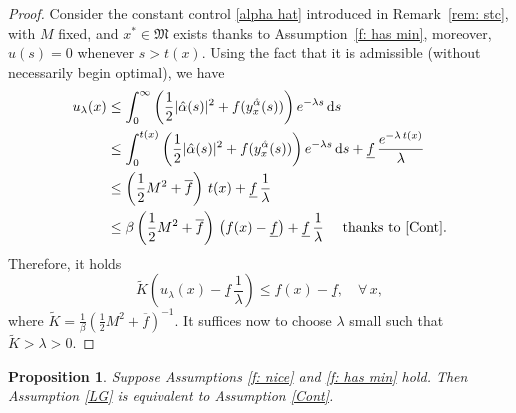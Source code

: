 \documentclass[12pt]{amsart}
\newcommand{\D}[1]{\mbox{\rm #1}}
\newcommand{\dd}{\D{d}}
\numberwithin{equation}{section}
\theoremstyle{plain}
\newtheorem{proposition}[theorem]{Proposition}
\begin{document}
\begin{proof}
Consider the constant control \eqref{alpha hat} introduced in Remark~\ref{rem: stc}, with $M$ fixed, and  $x^{*}\in \mathfrak{M}$ exists thanks to Assumption~\ref{f: has min}, moreover, $\hat{u}(s) = 0$ whenever $s> t(x)$.  Using the fact that it is admissible (without necessarily begin optimal), we have
\begingroup
\allowdisplaybreaks
\begin{align*}
    u_{\lambda}(x) 
    & \leq \int_{0}^{\infty} \left(\frac{1}{2}|\hat{\alpha}(s)|^{2} + f(y_{x}^{\hat{\alpha}}(s))\right)e^{-\lambda s}\, \dd s\\
    & \leq \int_{0}^{t(x)} \left(\frac{1}{2}|\hat{\alpha}(s)|^{2} + f(y_{x}^{\hat{\alpha}}(s))\right)e^{-\lambda s}\, \dd s + \underline{f}\,\frac{e^{-\lambda \,t(x)}}{\lambda}\\
    & \leq  \left(\frac{1}{2}M^{2} + \overline{f}\right)\,t(x) + \underline{f}\,\frac{1}{\lambda}\\
    & \leq \beta\left(\frac{1}{2}M^{2} + \overline{f}\right)\,\big(f(x) - \underline{f}\big) + \underline{f}\,\frac{1}{\lambda} \quad \text{ thanks to \ref{Cont}.}
\end{align*}
\endgroup
Therefore, it holds
\begin{equation*}
    \widetilde{K}\left(u_{\lambda}(x) - \underline{f}\,\frac{1}{\lambda}\right)
    \leq f(x) - \underline{f}, \quad \forall\, x,
\end{equation*}
 where $\widetilde{K} = \frac{1}{\beta}\left(\frac{1}{2}M^{2} + \overline{f}\right)^{-1}$. It suffices now to choose $\lambda$ small such that $\widetilde{K}> \lambda>0$. 
\end{proof}




\begin{proposition}\label{prop: contr implies lin}
Suppose Assumptions \ref{f: nice} and \ref{f: has min} hold. 
Then 
Assumption \ref{LG} is equivalent to Assumption \ref{Cont}.
\end{proposition}
\end{document}

